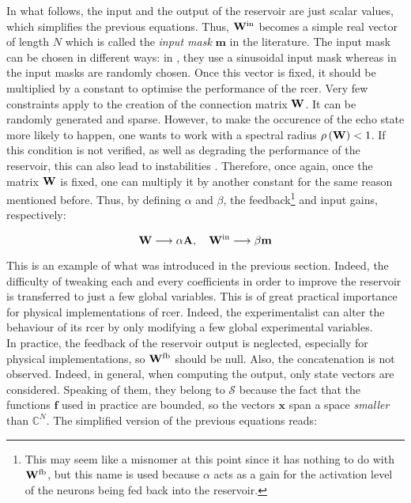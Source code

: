 In what follows, the input and the output of the reservoir are just scalar values, which simplifies the previous equations. Thus, $\mathbf{W}^{\text{in}}$ becomes a simple real vector of length $N$ which is called the \textit{input mask} $\mathbf{m}$ in the literature. The input mask can be chosen in different ways: in \cite{Duport2016}, they use a sinusoidal input mask whereas in \cite{Antonik2017, Vinckier2015, Paquot2012} the input masks are randomly chosen. Once this vector is fixed, it should be multiplied by a constant to optimise the performance of the \gls{rcer}. Very few constraints apply to the creation of the connection matrix $\mathbf{W}$. It can be randomly generated and sparse. However, to make the occurence of the echo state more likely to happen, one wants to work with a spectral radius $\rho \left( \mathbf{W} \right)<1$. If this condition is not verified, as well as degrading the performance of the reservoir, this can also lead to instabilities \cite{Lukoeviius2009}. Therefore, once again, once the matrix $\mathbf{W}$ is fixed, one can multiply it by another constant for the same reason mentioned before. Thus, by defining $\alpha$ and $\beta$,  the feedback\footnote{This may seem like a misnomer at this point since it has nothing to do with $\mathbf{W}^{\text{fb}}$, but this name is used because $\alpha$ acts as a gain for the activation level of the neurons being fed back into the reservoir.} and input gains, respectively:

\begin{equation}
	\mathbf{W} \longrightarrow \alpha \mathbf{A}, \quad \mathbf{W}^{\text{in}} \longrightarrow \beta \mathbf{m}
\end{equation}

This is an example of what was introduced in the previous section. Indeed, the difficulty of tweaking each and every coefficients in order to improve the reservoir is transferred to just a few global variables. This is of great practical importance for physical implementations of \gls{rcer}. Indeed, the experimentalist can alter the behaviour of its \gls{rcer} by only modifying a few global experimental variables.\\

In practice, the feedback of the reservoir output is neglected, especially for physical implementations, so $\mathbf{W}^{\text{fb}}$ should be null. Also, the concatenation is not observed. Indeed, in general, when computing the output, only state vectors are considered. Speaking of them, they belong to $\mathcal{S}$ because the fact that the functions $\mathbf{f}$ used in practice are bounded, so the vectors $\mathbf{x}$ span a space \textit{smaller} than $\mathbb{C}^N$. The simplified version of the previous equations reads:

